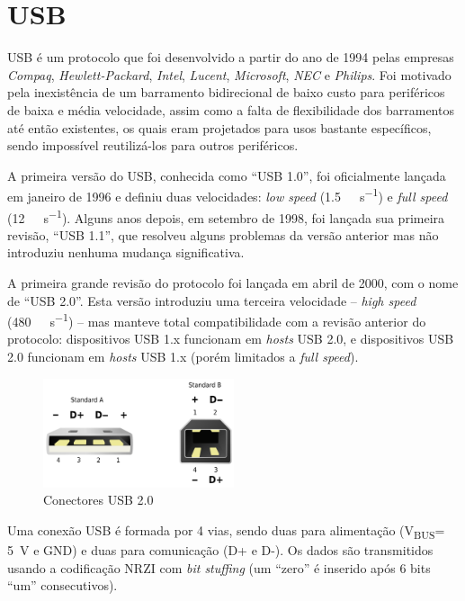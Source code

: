 \documentclass[brazil,pagestart=firstchapter]{abnt}
\newcommand{\VBUS}{V\textsubscript{BUS}\xspace}
\newcommand{\GND}{GND\xspace}
\begin{document}
\section{USB\label{sec:usb}}

\ac{USB} é um protocolo que foi desenvolvido a partir do ano de 1994 pelas
empresas \textit{Compaq}, \textit{Hewlett-Packard}, \textit{Intel},
\textit{Lucent}, \textit{Microsoft}, \textit{NEC} e \textit{Philips}. Foi
motivado pela inexistência de um barramento bidirecional de baixo custo para
periféricos de baixa e média velocidade, assim como a falta de flexibilidade
dos barramentos até então existentes, os quais eram projetados para usos
bastante específicos, sendo impossível reutilizá-los para outros
periféricos. \cite{usb20}

A primeira versão do \ac{USB}, conhecida como ``USB 1.0'', foi oficialmente
lançada em janeiro de 1996 e definiu duas velocidades: \textit{low speed}
(\SI{1.5}{\mega\bit\per\second}) e \textit{full speed}
(\SI{12}{\mega\bit\per\second}). Alguns anos depois, em setembro de 1998, foi
lançada sua primeira revisão, ``USB 1.1'', que resolveu alguns problemas da
versão anterior mas não introduziu nenhuma mudança significativa.

A primeira grande revisão do protocolo foi lançada em abril de 2000, com o
nome de ``USB 2.0''. Esta versão introduziu uma terceira velocidade --
\textit{high speed} (\SI{480}{\mega\bit\per\second}) -- mas manteve total
compatibilidade com a revisão anterior do protocolo: dispositivos USB 1.x
funcionam em \textit{hosts} USB 2.0, e dispositivos USB 2.0 funcionam em
\textit{hosts} USB 1.x (porém limitados a \textit{full speed}).

\begin{figure}[h]
\centering
\includegraphics[width=0.5\textwidth]{img/USB.png}
\caption{Conectores USB 2.0}
\label{fig:usb_connectors}
\end{figure}

Uma conexão \ac{USB} é formada por 4 vias, sendo duas para alimentação
(\VBUS = \SI{+5}{\volt} e \GND) e duas para comunicação (D+ e D-). Os dados
são transmitidos usando a codificação \ac{NRZI} com \textit{bit stuffing}
(um ``zero'' é inserido após 6 bits ``um'' consecutivos).
\cite[p.~157]{usb20} \cite[cap.~2]{usbinanutshell}
\end{document}
